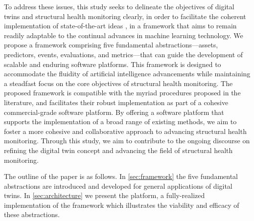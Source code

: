 To address these issues, this study seeks to delineate the objectives of digital twins and structural health monitoring clearly, in order to facilitate the coherent implementation of state-of-the-art ideas \citep{kapteyn2021probabilistic, torzoni2024digital}, in a framework that aims to remain readily adaptable to the continual advances in machine learning technology. 
We propose a framework comprising five fundamental abstractions—\glspl{asset}, \glspl{predictor}, \glspl{event}, \glspl{evaluation}, and \glspl{metric}—that can guide the development of scalable and enduring software platforms. This framework is designed to accommodate the fluidity of artificial intelligence advancements while maintaining a steadfast focus on the core objectives of structural health monitoring.
The proposed framework is compatible with the myriad procedures proposed in
the literature, and facilitates their robust implementation
as part of a cohesive commercial-grade software platform.
By offering a software platform that supports the implementation of a broad range of existing methods, we aim to foster a more cohesive and collaborative approach to advancing structural health monitoring. Through this study, we aim to contribute to the ongoing discourse on refining the digital twin concept and advancing the field of structural health monitoring.


The outline of the paper is as follows. In \cref{sec:framework} the five fundamental abstractions
are introduced and developed for general applications of digital twins. In \cref{sec:architecture} we present the \BRACE{} platform, a fully-realized implementation
of the framework which illustrates the viability and efficacy of these abstractions. 



